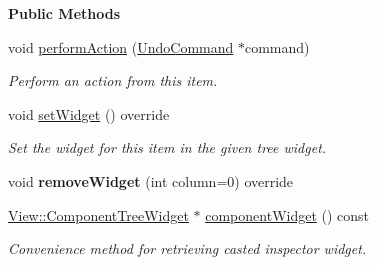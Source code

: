 \begin{Indent}\textbf{ Public Methods}\par
\begin{DoxyCompactItemize}
\item 
\mbox{\label{classrev_1_1_view_1_1_component_blueprint_item_ac0aa03ec499b071ea66a0b49f3ff6e87}} 
void \mbox{\hyperlink{classrev_1_1_view_1_1_component_blueprint_item_ac0aa03ec499b071ea66a0b49f3ff6e87}{perform\+Action}} (\mbox{\hyperlink{classrev_1_1_undo_command}{Undo\+Command}} $\ast$command)
\begin{DoxyCompactList}\small\item\em Perform an action from this item. \end{DoxyCompactList}\item 
void \mbox{\hyperlink{classrev_1_1_view_1_1_component_blueprint_item_a4e95fe4df8420803062b1d778ffb0649}{set\+Widget}} () override
\begin{DoxyCompactList}\small\item\em Set the widget for this item in the given tree widget. \end{DoxyCompactList}\item 
\mbox{\label{classrev_1_1_view_1_1_component_blueprint_item_a7302f67e5fe900fc90d58b9431f29b0f}} 
void {\bfseries remove\+Widget} (int column=0) override
\item 
\mbox{\label{classrev_1_1_view_1_1_component_blueprint_item_af73fdfdca1eda4710937d589ad67b894}} 
\mbox{\hyperlink{classrev_1_1_view_1_1_component_tree_widget}{View\+::\+Component\+Tree\+Widget}} $\ast$ \mbox{\hyperlink{classrev_1_1_view_1_1_component_blueprint_item_af73fdfdca1eda4710937d589ad67b894}{component\+Widget}} () const
\begin{DoxyCompactList}\small\item\em Convenience method for retrieving casted inspector widget. \end{DoxyCompactList}\end{DoxyCompactItemize}
\end{Indent}
